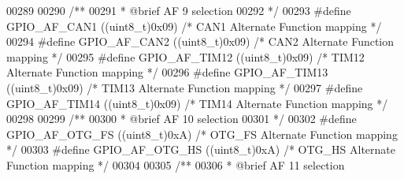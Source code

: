 \begin{DoxyCode}
00289 
00290 \textcolor{comment}{/** }
00291 \textcolor{comment}{  * @brief   AF 9 selection }
00292 \textcolor{comment}{  */}
00293 \textcolor{preprocessor}{#}\textcolor{preprocessor}{define} \textcolor{preprocessor}{GPIO\_AF\_CAN1}          \textcolor{preprocessor}{(}\textcolor{preprocessor}{(}\textcolor{preprocessor}{uint8\_t}\textcolor{preprocessor}{)}0x09\textcolor{preprocessor}{)}  \textcolor{comment}{/* CAN1 Alternate Function mapping */}
00294 \textcolor{preprocessor}{#}\textcolor{preprocessor}{define} \textcolor{preprocessor}{GPIO\_AF\_CAN2}          \textcolor{preprocessor}{(}\textcolor{preprocessor}{(}\textcolor{preprocessor}{uint8\_t}\textcolor{preprocessor}{)}0x09\textcolor{preprocessor}{)}  \textcolor{comment}{/* CAN2 Alternate Function mapping */}
00295 \textcolor{preprocessor}{#}\textcolor{preprocessor}{define} \textcolor{preprocessor}{GPIO\_AF\_TIM12}         \textcolor{preprocessor}{(}\textcolor{preprocessor}{(}\textcolor{preprocessor}{uint8\_t}\textcolor{preprocessor}{)}0x09\textcolor{preprocessor}{)}  \textcolor{comment}{/* TIM12 Alternate Function mapping */}
00296 \textcolor{preprocessor}{#}\textcolor{preprocessor}{define} \textcolor{preprocessor}{GPIO\_AF\_TIM13}         \textcolor{preprocessor}{(}\textcolor{preprocessor}{(}\textcolor{preprocessor}{uint8\_t}\textcolor{preprocessor}{)}0x09\textcolor{preprocessor}{)}  \textcolor{comment}{/* TIM13 Alternate Function mapping */}
00297 \textcolor{preprocessor}{#}\textcolor{preprocessor}{define} \textcolor{preprocessor}{GPIO\_AF\_TIM14}         \textcolor{preprocessor}{(}\textcolor{preprocessor}{(}\textcolor{preprocessor}{uint8\_t}\textcolor{preprocessor}{)}0x09\textcolor{preprocessor}{)}  \textcolor{comment}{/* TIM14 Alternate Function mapping */}
00298 
00299 \textcolor{comment}{/** }
00300 \textcolor{comment}{  * @brief   AF 10 selection  }
00301 \textcolor{comment}{  */}
00302 \textcolor{preprocessor}{#}\textcolor{preprocessor}{define} \textcolor{preprocessor}{GPIO\_AF\_OTG\_FS}         \textcolor{preprocessor}{(}\textcolor{preprocessor}{(}\textcolor{preprocessor}{uint8\_t}\textcolor{preprocessor}{)}0xA\textcolor{preprocessor}{)}  \textcolor{comment}{/* OTG\_FS Alternate Function mapping */}
00303 \textcolor{preprocessor}{#}\textcolor{preprocessor}{define} \textcolor{preprocessor}{GPIO\_AF\_OTG\_HS}         \textcolor{preprocessor}{(}\textcolor{preprocessor}{(}\textcolor{preprocessor}{uint8\_t}\textcolor{preprocessor}{)}0xA\textcolor{preprocessor}{)}  \textcolor{comment}{/* OTG\_HS Alternate Function mapping */}
00304 
00305 \textcolor{comment}{/** }
00306 \textcolor{comment}{  * @brief   AF 11 selection  }

\end{DoxyCode}
